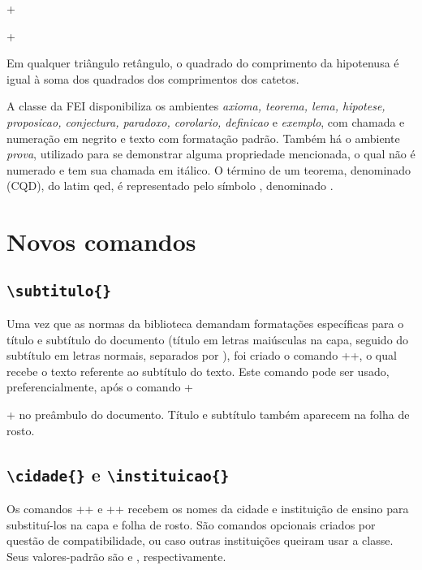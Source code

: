 \documentclass[xindy,rascunho]{fei}
\begin{document}
\latexinline+\begin{teorema}+

\begin{teorema}
Em qualquer triângulo retângulo, o quadrado do comprimento da hipotenusa é igual à soma dos quadrados dos comprimentos dos catetos.
\end{teorema}

A classe da FEI disponibiliza os ambientes \emph{axioma, teorema, lema, hipotese, proposicao, conjectura, paradoxo, corolario, definicao} e \emph{exemplo}, com chamada e numeração em negrito e texto com formatação padrão. Também há o ambiente \emph{prova}, utilizado para se demonstrar alguma propriedade mencionada, o qual não é numerado e tem sua chamada em itálico. O término de um teorema, denominado  (CQD), do latim \gls{qed}, é representado pelo símbolo \qedsymbol, denominado .

\section{Novos comandos}
    
    \subsection{\texttt{\textbackslash subtitulo\{\}}}
    Uma vez que as normas da biblioteca demandam formatações específicas para o título e subtítulo do documento (título em letras maiúsculas na capa, seguido do subtítulo em letras normais, separados por \aspas{:}), foi criado o comando \latexinline+\subtitulo{}+, o qual recebe o texto referente ao subtítulo do texto. Este comando pode ser usado, preferencialmente, após o comando \latexinline+\title{}+ no preâmbulo do documento. Título e subtítulo também aparecem na folha de rosto.
    
    \subsection{\texttt{\textbackslash cidade\{\}} e \texttt{\textbackslash instituicao\{\}}}
    Os comandos \latexinline+\cidade{}+ e \latexinline+\instituicao{}+ recebem os nomes da cidade e instituição de ensino para substituí-los na capa e folha de rosto. São comandos opcionais criados por questão de compatibilidade, ou caso outras instituições queiram usar a classe. Seus valores-padrão são  e , respectivamente.
    

\end{teorema}
\end{document}
